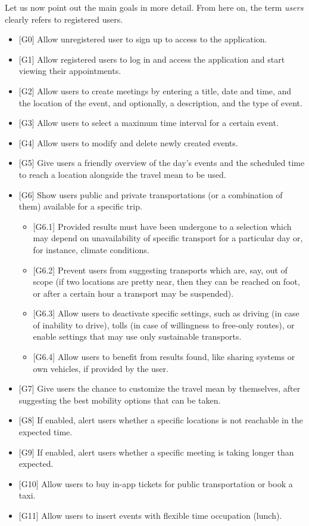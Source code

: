 Let us now point out the main goals in more detail. From here on, the term \textit{users} clearly refers to registered users.
\begin{itemize}
\item {[G0]} Allow unregistered user to sign up to access to the application.
\item {[G1]} Allow registered users to log in and access the application and start viewing their appointments.
\item {[G2]} Allow users to create meetings by entering a title, date and time, and the location of the event, and optionally, a description, and the type of event.
\item {[G3]} Allow users to select a maximum time interval for a certain event.
\item {[G4]} Allow users to modify and delete newly created events.
\item {[G5]} Give users a friendly overview of the day's events and the scheduled time to reach a location alongside the travel mean to be used.
\item {[G6]} Show users public and private transportations (or a combination of them) available for a specific trip.
\begin{itemize}
\item {[G6.1]} Provided results must have been undergone to a selection which may depend on unavailability of specific transport for a particular day or, for instance, climate conditions.
\item {[G6.2]} Prevent users from suggesting transports which are, say, out of scope (if two locations are pretty near, then they can be reached on foot, or after a certain hour a transport may be suspended). 
\item {[G6.3]} Allow users to deactivate specific settings, such as driving (in case of inability to drive), tolls (in case of willingness to free-only routes), or enable settings that may use only sustainable transports.
\item {[G6.4]} Allow users to benefit from results found, like sharing systems or own vehicles, if provided by the user.
\end{itemize}
\item {[G7]} Give users the chance to customize the travel mean by themselves, after suggesting the best mobility options that can be taken.
\item {[G8]} If enabled, alert users whether a specific locations is not reachable in the expected time.
\item {[G9]} If enabled, alert users whether a specific meeting is taking longer than expected.
\item {[G10]} Allow users to buy in-app tickets for public transportation or book a taxi.
\item {[G11]} Allow users to insert events with flexible time occupation (lunch). 
\end{itemize}


